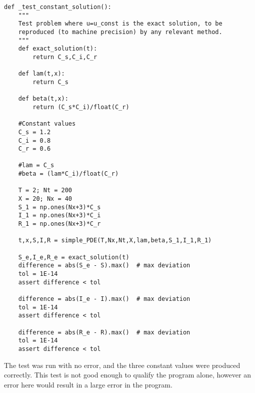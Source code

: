 \documentclass[%
twoside,                 %
final,                   %
chapterprefix=true,      %
open=right               %
10pt]{book}
\begin{document}
\begin{Verbatim}[numbers=none,fontsize=\fontsize{9pt}{9pt},baselinestretch=0.95]
def _test_constant_solution():
    """
    Test problem where u=u_const is the exact solution, to be
    reproduced (to machine precision) by any relevant method.
    """
    def exact_solution(t):
        return C_s,C_i,C_r
    
    def lam(t,x):
        return C_s

    def beta(t,x):
        return (C_s*C_i)/float(C_r)

    #Constant values
    C_s = 1.2
    C_i = 0.8
    C_r = 0.6
    
    #lam = C_s
    #beta = (lam*C_i)/float(C_r)
    
    T = 2; Nt = 200
    X = 20; Nx = 40
    S_1 = np.ones(Nx+3)*C_s
    I_1 = np.ones(Nx+3)*C_i
    R_1 = np.ones(Nx+3)*C_r
    
    t,x,S,I,R = simple_PDE(T,Nx,Nt,X,lam,beta,S_1,I_1,R_1)
    
    S_e,I_e,R_e = exact_solution(t)
    difference = abs(S_e - S).max()  # max deviation
    tol = 1E-14
    assert difference < tol

    difference = abs(I_e - I).max()  # max deviation
    tol = 1E-14
    assert difference < tol

    difference = abs(R_e - R).max()  # max deviation
    tol = 1E-14
    assert difference < tol
\end{Verbatim}

The test was run with no error, and the three constant values were produced correctly. This test is not good enough to qualify the program alone, however an error here would result in a large error in the program. 
\end{document}
